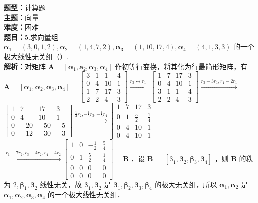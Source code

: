 \documentclass{ctexart}
\newenvironment{question}[5]{%
	\noindent\textbf{题型：}#1\\
	\textbf{主题：}#2\\
	\textbf{难度：}#3\\
	\textbf{题目：}#4\\
	\textbf{解析：}#5\\
	\vspace{1em}
}{}
\begin{document}
	\begin{question}
		{计算题}
		{向量}
		{困难}
		{5.求向量组 \(\boldsymbol{\alpha}_1=(3,0,1,2), \boldsymbol{\alpha}_2=(1,4,7,2), \boldsymbol{\alpha}_3=(1,10,17,4), \boldsymbol{\alpha}_4=(4,1,3,3)\) 的一个极大线性无关组（）. }
		{对矩阵 \(\mathbf{A}=\left[\boldsymbol{\alpha}_1, \boldsymbol{a}_2, \boldsymbol{\alpha}_3, \boldsymbol{\alpha}_4\right]\) 作初等行变换，将其化为行最简形矩阵，有 \(\mathbf{A}=\left[\boldsymbol{\alpha}_1, \boldsymbol{\alpha}_2, \boldsymbol{\alpha}_3, \boldsymbol{\alpha}_4\right]=\left[\begin{array}{cccc}3 & 1 & 1 & 4 \\ 0 & 4 & 10 & 1 \\ 1 & 7 & 17 & 3 \\ 2 & 2 & 4 & 3\end{array}\right] \xrightarrow{r_3 \leftrightarrow r_1}\) \(\left[\begin{array}{cccc}1 & 7 & 17 & 3 \\ 0 & 4 & 10 & 1 \\ 3 & 1 & 1 & 4 \\ 2 & 2 & 4 & 3\end{array}\right] \xrightarrow{r_3-3 r_1, r_4-2 r_1}\)
			\(\left[\begin{array}{cccc}1 & 7 & 17 & 3 \\ 0 & 4 & 10 & 1 \\ 0 & -20 & -50 & -5 \\ 0 & -12 & -30 & -3\end{array}\right] \xrightarrow{\frac{1}{4} r_2,-\frac{1}{5} r_3,-\frac{1}{3} r_4}\left[\begin{array}{cccc}1 & 7 & 17 & 3 \\ 0 & 1 & \frac{5}{2} & \frac{1}{4} \\ 0 & 4 & 10 & 1 \\ 0 & 4 & 10 & 1\end{array}\right]\)
			\(\xrightarrow{r_1-7 r_2, r_3-4 r_2, r_4-4 r_2}\left[\begin{array}{cccc}1 & 0 & -\frac{1}{2} & \frac{5}{4} \\ 0 & 1 & \frac{5}{2} & \frac{1}{4} \\ 0 & 0 & 0 & 0 \\ 0 & 0 & 0 & 0\end{array}\right]=\mathbf{B}\) ．设 \(\mathbf{B}=\) \(\left[\boldsymbol{\beta}_1, \boldsymbol{\beta}_2, \boldsymbol{\beta}_3, \boldsymbol{\beta}_4\right]\) ，则 \(\mathbf{B}\) 的秩为 \(2, \boldsymbol{\beta}_1, \boldsymbol{\beta}_2\) 线性无关，故 \(\boldsymbol{\beta}_1, \boldsymbol{\beta}_2\) 是 \(\boldsymbol{\beta}_1, \boldsymbol{\beta}_2, \boldsymbol{\beta}_3, \boldsymbol{\beta}_4\) 的极大无关组，所以 \(\boldsymbol{\alpha}_1, \boldsymbol{\alpha}_2\) 是 \(\boldsymbol{\alpha}_1, \boldsymbol{\alpha}_2, \boldsymbol{\alpha}_3, \boldsymbol{\alpha}_4\) 的一个极大线性无关组．}
	\end{question}
	
\end{document}
